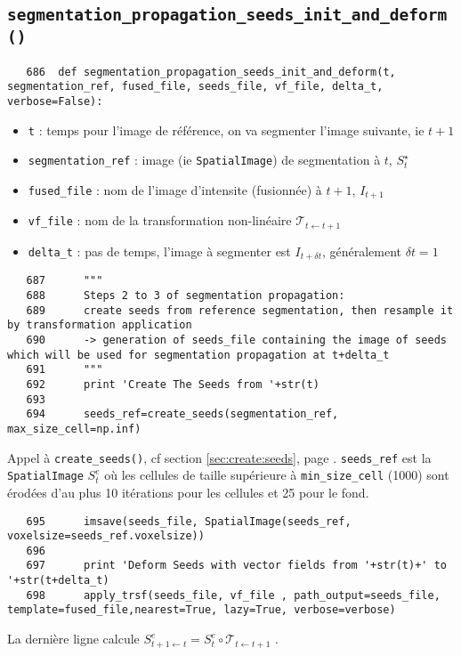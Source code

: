 \documentclass{article}
\def \mycolor {red}
\begin{document}
\subsection{\texttt{segmentation\_propagation\_seeds\_init\_and\_deform()}}
\label{sec:segmentation:propagation:seeds:init:and:deform}
\begin{verbatim}
   686	def segmentation_propagation_seeds_init_and_deform(t, segmentation_ref, fused_file, seeds_file, vf_file, delta_t, verbose=False):
\end{verbatim}
\color{\mycolor}
\begin{itemize}
\itemsep -0.5ex
\item \verb|t| : temps pour l'image de r\'ef\'erence, on va segmenter l'image suivante, ie $t+1$
\item \verb|segmentation_ref| : image (ie \texttt{SpatialImage}) de segmentation \`a $t$, $S^{\star}_t$
\item \verb|fused_file| : nom de l'image d'intensite (fusionn\'ee) \`a $t+1$, $I_{t+1}$
\item \verb|vf_file| : nom de la  transformation non-lin\'eaire $\mathcal{T}_{t \leftarrow t+1}$
\item \verb|delta_t| : pas de temps, l'image \`a segmenter est $I_{t+\delta t}$, g\'en\'eralement $\delta t = 1$
\end{itemize}
\color{black}
\begin{verbatim}  
   687	    """
   688	    Steps 2 to 3 of segmentation propagation:
   689	    create seeds from reference segmentation, then resample it by transformation application
   690	    -> generation of seeds_file containing the image of seeds which will be used for segmentation propagation at t+delta_t
   691	    """
   692	    print 'Create The Seeds from '+str(t)
   693	
   694	    seeds_ref=create_seeds(segmentation_ref, max_size_cell=np.inf)
\end{verbatim} 
\color{\mycolor}
Appel \`a \texttt{create\_seeds()}, cf section \ref{sec:create:seeds}, page \pageref{sec:create:seeds}.
\verb|seeds_ref| est la \texttt{SpatialImage} $S^e_t$ \cite[section 2.3.3.4]{guignard:tel-01278725} o\`u les cellules de taille sup\'erieure \`a \verb|min_size_cell| (1000) sont \'erod\'ees d'au plus 10 it\'erations pour les cellules et 25 pour le fond.
\color{black}
\begin{verbatim}  
   695	    imsave(seeds_file, SpatialImage(seeds_ref, voxelsize=seeds_ref.voxelsize))
   696	    
   697	    print 'Deform Seeds with vector fields from '+str(t)+' to '+str(t+delta_t)
   698	    apply_trsf(seeds_file, vf_file , path_output=seeds_file, template=fused_file,nearest=True, lazy=True, verbose=verbose)
\end{verbatim}
\color{\mycolor}
La derni\`ere ligne calcule $S^e_{t+1 \leftarrow t} = S^e_t \circ \mathcal{T}_{t \leftarrow t+1} $ \cite[section 2.3.3.4]{guignard:tel-01278725}.
\color{black}
\end{document}
